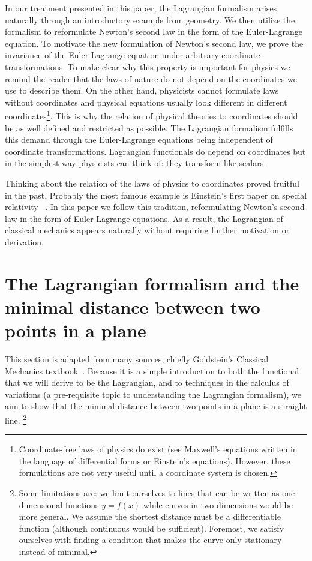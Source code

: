 \documentclass[prb,preprint]{revtex4-1}
\begin{document}
In our treatment presented in this paper, the Lagrangian formalism arises naturally through an introductory example from geometry. We then utilize the formalism to reformulate Newton's second law in the form of the Euler-Lagrange equation. To motivate the new formulation of Newton's second law, we prove the invariance of the Euler-Lagrange equation under arbitrary coordinate transformations. To make clear why this property is important for physics we remind the reader that the laws of nature do not depend on the coordinates we use to describe them. On the other hand, physicists cannot formulate laws without coordinates and physical equations usually look different in different coordinates\footnote{Coordinate-free laws of physics do exist (see Maxwell's equations written in the language of differential forms or Einstein's equations). However, these formulations are not very useful until a coordinate system is chosen.}. This is why the relation of physical theories to coordinates should be as well defined and restricted as possible. The Lagrangian formalism fulfills this demand through the Euler-Lagrange equations being independent of coordinate transformations. Lagrangian functionals do depend on coordinates but in the simplest way physicists can think of: they transform like scalars.

Thinking about the relation of the laws of physics to coordinates proved fruitful in the past.
Probably the most famous example is Einstein's first paper on special relativity ~\cite{EinsteinSpecialRelativity}.
In this paper we follow this tradition, reformulating Newton's second law in the form of Euler-Lagrange equations. As a result, the Lagrangian of classical mechanics appears naturally without requiring further motivation or derivation. 


\section{The Lagrangian formalism and the minimal distance between two points in a plane}\label{distance}

This section is adapted from many sources, chiefly Goldstein's Classical Mechanics textbook~\cite{goldstein2002classical}. Because it is a simple introduction to both the functional that we will derive to be the Lagrangian, and to techniques in the calculus of variations (a pre-requisite topic to understanding the Lagrangian formalism), we aim to show that the minimal distance between two points in a plane is a straight line. 
\footnote{Some limitations are: we limit ourselves to lines that can be written as one dimensional functions $y=f(x)$ while curves in two dimensions would be more general. We assume the shortest distance must be a differentiable function (although continuous would be sufficient). Foremost, we satisfy ourselves with finding a condition that makes the curve only stationary instead of minimal.}
\end{document}
